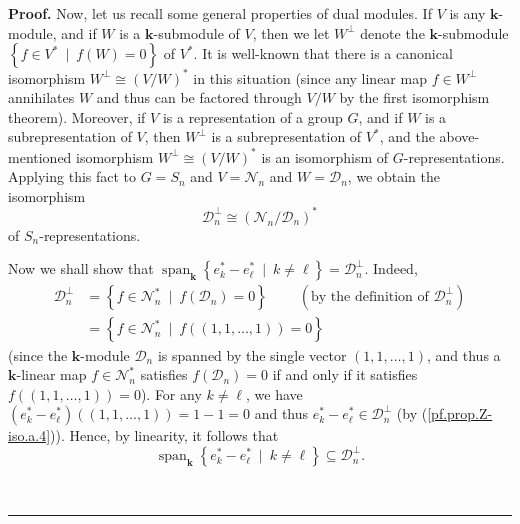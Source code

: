 \documentclass[numbers=enddot,12pt,final,onecolumn,notitlepage]{scrartcl}%
\theoremstyle{definition}
\newenvironment{proof}[1][Proof]{\noindent\textbf{#1.} }{\ \rule{0.5em}{0.5em}}
\begin{document}
\begin{proof}
Now, let us recall some general properties of dual modules. If $V$ is any
$\mathbf{k}$-module, and if $W$ is a $\mathbf{k}$-submodule of $V$, then we
let $W^{\perp}$ denote the $\mathbf{k}$-submodule $\left\{  f\in V^{\ast
}\ \mid\ f\left(  W\right)  =0\right\}  $ of $V^{\ast}$. It is well-known that
there is a canonical isomorphism $W^{\perp}\cong\left(  V/W\right)  ^{\ast}$
in this situation (since any linear map $f\in W^{\perp}$ annihilates $W$ and
thus can be factored through $V/W$ by the first isomorphism theorem).
Moreover, if $V$ is a representation of a group $G$, and if $W$ is a
subrepresentation of $V$, then $W^{\perp}$ is a subrepresentation of $V^{\ast
}$, and the above-mentioned isomorphism $W^{\perp}\cong\left(  V/W\right)
^{\ast}$ is an isomorphism of $G$-representations. Applying this fact to
$G=S_{n}$ and $V=\mathcal{N}_{n}$ and $W=\mathcal{D}_{n}$, we obtain the
isomorphism%
\begin{equation}
\mathcal{D}_{n}^{\perp}\cong\left(  \mathcal{N}_{n}/\mathcal{D}_{n}\right)
^{\ast} \label{pf.prop.Z-iso.a.3}%
\end{equation}
of $S_{n}$-representations.

Now we shall show that $\operatorname*{span}\nolimits_{\mathbf{k}}\left\{
e_{k}^{\ast}-e_{\ell}^{\ast}\ \mid\ k\neq\ell\right\}  =\mathcal{D}_{n}%
^{\perp}$. Indeed,
\begin{align}
\mathcal{D}_{n}^{\perp}  &  =\left\{  f\in\mathcal{N}_{n}^{\ast}%
\ \mid\ f\left(  \mathcal{D}_{n}\right)  =0\right\}
\ \ \ \ \ \ \ \ \ \ \left(  \text{by the definition of }\mathcal{D}_{n}%
^{\perp}\right) \nonumber\\
&  =\left\{  f\in\mathcal{N}_{n}^{\ast}\ \mid\ f\left(  \left(  1,1,\ldots
,1\right)  \right)  =0\right\}  \label{pf.prop.Z-iso.a.4}%
\end{align}
(since the $\mathbf{k}$-module $\mathcal{D}_{n}$ is spanned by the single
vector $\left(  1,1,\ldots,1\right)  $, and thus a $\mathbf{k}$-linear map
$f\in\mathcal{N}_{n}^{\ast}$ satisfies $f\left(  \mathcal{D}_{n}\right)  =0$
if and only if it satisfies $f\left(  \left(  1,1,\ldots,1\right)  \right)
=0$). For any $k\neq\ell$, we have $\left(  e_{k}^{\ast}-e_{\ell}^{\ast
}\right)  \left(  \left(  1,1,\ldots,1\right)  \right)  =1-1=0$ and thus
$e_{k}^{\ast}-e_{\ell}^{\ast}\in\mathcal{D}_{n}^{\perp}$ (by
(\ref{pf.prop.Z-iso.a.4})). Hence, by linearity, it follows that
\begin{equation}
\operatorname*{span}\nolimits_{\mathbf{k}}\left\{  e_{k}^{\ast}-e_{\ell}%
^{\ast}\ \mid\ k\neq\ell\right\}  \subseteq\mathcal{D}_{n}^{\perp}.
\label{pf.prop.Z-iso.a.6}%
\end{equation}



\end{proof}
\end{document}
